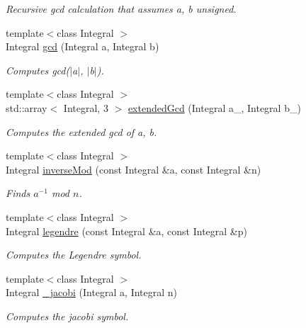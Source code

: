 \begin{DoxyCompactItemize}
\begin{DoxyCompactList}\small\item\em Recursive gcd calculation that assumes a, b unsigned. \end{DoxyCompactList}\item 
{\footnotesize template$<$class Integral $>$ }\\Integral \hyperlink{namespacecryptomath_aa611c2ae215df44cc0b7d967642ce252}{gcd} (Integral a, Integral b)
\begin{DoxyCompactList}\small\item\em Computes gcd($\vert$a$\vert$, $\vert$b$\vert$). \end{DoxyCompactList}\item 
{\footnotesize template$<$class Integral $>$ }\\std\+::array$<$ Integral, 3 $>$ \hyperlink{namespacecryptomath_ade73e96f11f5b082fda92068b63e07e4}{extended\+Gcd} (Integral a\+\_\+, Integral b\+\_\+)
\begin{DoxyCompactList}\small\item\em Computes the extended gcd of a, b. \end{DoxyCompactList}\item 
{\footnotesize template$<$class Integral $>$ }\\Integral \hyperlink{namespacecryptomath_a3016a6b389d67dbc28682a48776df32a}{inverse\+Mod} (const Integral \&a, const Integral \&n)
\begin{DoxyCompactList}\small\item\em Finds $ a^{-1} $ mod $ n $. \end{DoxyCompactList}\item 
{\footnotesize template$<$class Integral $>$ }\\Integral \hyperlink{namespacecryptomath_ae79615d1b307a407ebe932c452279682}{legendre} (const Integral \&a, const Integral \&p)
\begin{DoxyCompactList}\small\item\em Computes the Legendre symbol. \end{DoxyCompactList}\item 
{\footnotesize template$<$class Integral $>$ }\\Integral \hyperlink{namespacecryptomath_a4c17a71b0bde52c2e11acefc3975210f}{\+\_\+jacobi} (Integral a, Integral n)
\begin{DoxyCompactList}\small\item\em Computes the jacobi symbol. \end{DoxyCompactList}\item 

\end{DoxyCompactItemize}
